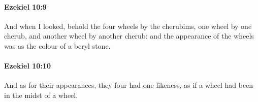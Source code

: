 		\paragraph{Ezekiel 10:9} %
			\label{EZEKIEL-10-9}

			And when I looked, behold the four wheels by the cherubims, one wheel by one cherub, and another wheel by another cherub: and the appearance of the wheels was as the colour of a beryl stone.


		\paragraph{Ezekiel 10:10} %
			\label{EZEKIEL-10-10}

			And as for their appearances, they four had one likeness, as if a wheel had been in the midst of a wheel.


